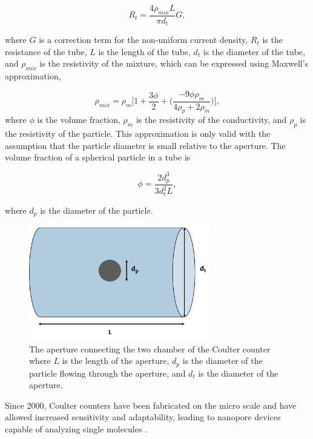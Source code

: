 \begin{equation}
    R_t = \frac{4\rho_{mix}L}{\pi d_{t}} G,
    \label{eqn:tube_resistance}
\end{equation}

\noindent where $G$ is a correction term for the non-uniform current density, $R_t$ is the resistance of the tube, $L$ is the length of the tube, $d_{t}$ is the diameter of the tube, and $\rho_{mix}$ is the resistivity of the mixture, which can be expressed using Maxwell's approximation, 

\begin{equation}
    \rho_{mix} = \rho_m\bigg[ 1 + \frac{3\phi}{2} + \Big(\frac{-9\phi \rho_m}{4 \rho_p + 2 \rho_m}\Big)\bigg],
\end{equation}
\noindent where $\phi$ is the volume fraction, $\rho_m$ is the resistivity of the conductivity, and $\rho_p$ is the resistivity of the particle. This approximation is only valid with the assumption that the particle diameter is small relative to the aperture. The volume fraction of a spherical particle in a tube is

\begin{equation}
    \phi = \frac{2d_p^3}{3d^2_tL},
\end{equation}

\noindent where $d_p$ is the diameter of the particle.

\begin{figure}[ht]
    \centering
    \includegraphics[width=0.7\textwidth]{images/aperture.png}
    \caption[The aperture connecting the two chamber of the Coulter counter.]{The aperture connecting the two chamber of the Coulter counter where $L$ is the length of the aperture, $d_p$ is the diameter of the particle flowing through the aperture, and $d_{t}$ is the diameter of the aperture.}
    \label{fig:aperture}
\end{figure}
 
\par Since 2000, Coulter counters have been fabricated on the micro scale and have allowed increased sensitivity and adaptability, leading to nanopore devices capable of analyzing single molecules \cite{sun_single-cell_2010}.
 
